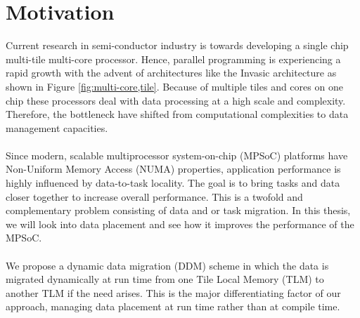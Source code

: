 \documentclass{listhesis}
\begin{document}
\section{Motivation}
Current research in semi-conductor industry is towards developing a single chip multi-tile multi-core processor. Hence, parallel programming is experiencing a rapid growth with the advent of architectures like the Invasic architecture as shown in Figure \ref{fig:multi-core,tile}. Because of multiple tiles and cores on one chip these processors deal with data processing at a high scale and complexity. Therefore, the bottleneck have shifted from computational complexities to data management capacities.\\
\\
Since modern, scalable multiprocessor system-on-chip (MPSoC) platforms have Non-Uniform Memory Access (NUMA) properties, application performance is highly influenced by data-to-task locality. The goal is to bring tasks and data closer together to increase overall performance. This is a twofold and complementary problem consisting of data and or task migration. In this thesis, we will look into data placement and see how it improves the performance of the MPSoC.\\
\\
We propose a dynamic data migration (DDM) scheme in which the data is migrated dynamically at run time from one Tile Local Memory (TLM) to another TLM if the need arises. This is the major differentiating factor of our approach, managing data placement at run time rather than at compile time.
\end{document}
